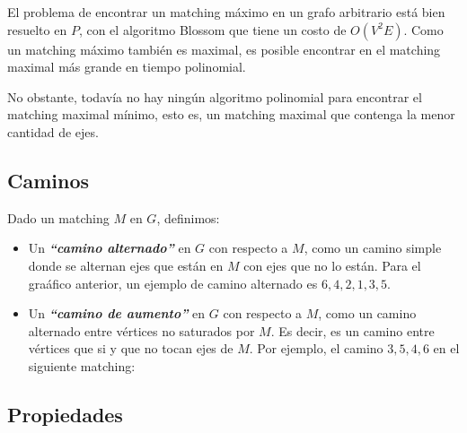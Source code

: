 El problema de encontrar un matching m\'aximo en un grafo arbitrario est\'a bien resuelto en $P$, con el algoritmo Blossom que tiene un costo de $O(V^{2}E)$. Como un matching m\'aximo tambi\'en es maximal, es posible encontrar en el matching maximal m\'as grande en tiempo polinomial.

No obstante, todav\'ia no hay ning\'un algoritmo polinomial para encontrar el matching maximal m\'inimo, esto es, un matching maximal que contenga la menor cantidad de ejes.

\newpage
\subsection{Caminos}

Dado un matching $M$ en $G$, definimos:

\begin{itemize}
\item Un \textbf{\emph{``camino alternado''}} en $G$ con respecto a $M$, como un camino simple donde se alternan ejes que est\'an en $M$ con ejes que no lo est\'an. Para el gra\'afico anterior, un ejemplo de camino alternado es $6,4,2,1,3,5$.
\item Un \textbf{\emph{``camino de aumento''}} en $G$ con respecto a $M$, como un camino alternado entre v\'ertices no saturados por $M$. Es decir, es un camino entre v\'ertices que si y que no tocan ejes de $M$. Por ejemplo, el camino $3,5,4,6$ en el siguiente matching:

\raggedright
\bigskip
\begin{center}
\end{center}
\raggedright
\bigskip

\end{itemize}

\subsection{Propiedades}

